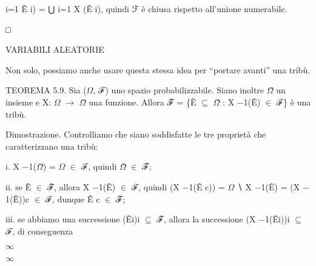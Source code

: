 \documentclass[a4paper,portrait,12pt]{article}
\begin{document}
\begin{flushleft}
i=1 Ẽ i) = ⋃ i=1 X (Ẽ i), quindi ℱ \`{e} chiusa rispetto all'unione numerabile.
\end{flushleft}





□










\begin{flushleft}
VARIABILI ALEATORIE
\end{flushleft}





\begin{flushleft}
Non solo, possiamo anche usare questa stessa idea per {``}portare avanti'' una tribù.
\end{flushleft}


\begin{flushleft}
TEOREMA 5.9. Sia ($\Omega$, ℱ) uno spazio probabilizzabile. Siano inoltre $\Omega$̃ un insieme e X: $\Omega$ $\rightarrow$ $\Omega$̃ una funzione. Allora ℱ̃ = \{Ẽ $\subseteq$ $\Omega$̃ : X $-$1(Ẽ) $\in$ ℱ\} \`{e} una tribù.
\end{flushleft}


\begin{flushleft}
Dimostrazione. Controlliamo che siano soddisfatte le tre propriet\`{a} che caratterizzano una tribù:
\end{flushleft}


\begin{flushleft}
i. X $-$1($\Omega$̃) = $\Omega$ $\in$ ℱ, quindi $\Omega$̃ $\in$ ℱ̃;
\end{flushleft}


\begin{flushleft}
ii. se Ẽ $\in$ ℱ̃, allora X $-$1(Ẽ) $\in$ ℱ, quindi (X $-$1(Ẽ c)) = $\Omega$ ∖ X $-$1(Ẽ) = (X $-$1(Ẽ))c $\in$ ℱ, dunque Ẽ c $\in$ ℱ̃;
\end{flushleft}


\begin{flushleft}
iii. se abbiamo una successione (Ẽi)i $\subseteq$ ℱ̃, allora la successione (X $-$1(Ẽi))i $\subseteq$ ℱ, di conseguenza
\end{flushleft}


$\infty$


$\infty$
\end{document}
